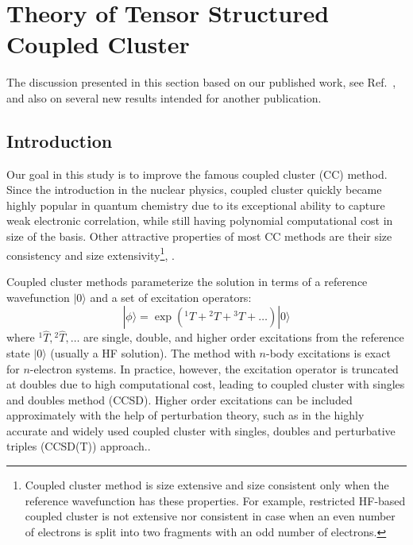 \chapter{Theory of Tensor Structured Coupled Cluster
\label{ch:tcc}} 
The discussion presented in this section based on our published work, see 
Ref.~\cite{schutski2017tensor}, and also on several new results intended for 
another publication.

\section{Introduction}
\label{sec:Introduction} 
Our goal in this study is to improve the famous coupled cluster (CC)
method. Since the introduction in the nuclear physics,\cite{coester1958bound, 
coester1960short} coupled cluster quickly became highly popular in quantum 
chemistry due to its exceptional ability to capture weak electronic correlation, 
while still having polynomial computational cost in size of the basis. Other 
attractive properties of most CC methods are their size consistency and size 
extensivity\footnote{Coupled cluster method is size 
extensive and size consistent only when the reference 
wavefunction has these properties. For example, 
restricted HF-based coupled cluster is not extensive nor consistent in case 
when an even number of electrons is split into two fragments with an odd number 
of electrons.}, \cite{pople1978electron, 
bartlett1978many, crawford2000introduction, bartlett2007coupled}. 

Coupled cluster methods parameterize the solution in terms of a reference 
wavefunction $| 0 \rangle$ and a set of excitation operators:
\begin{equation}
 | \phi \rangle  = \exp({}^1\hat{T} + {}^2\hat{T} + {}^3\hat{T} + \ldots) | 0 
\rangle
\end{equation}
where ${}^1\hat{T}, {}^2\hat{T}, \ldots$ are single, double, and 
higher order excitations from the reference state $| 0 \rangle$ (usually a HF 
solution). The method with $n$-body excitations is exact for $n$-electron 
systems. In practice, however, the excitation operator is truncated at doubles 
due to high computational cost, leading to coupled cluster with singles and 
doubles method (CCSD).\cite{purvis1982full} Higher order excitations can be 
included approximately with the help of perturbation theory, such as in the 
highly accurate and widely used coupled cluster with singles, doubles and 
perturbative triples (CCSD(T)) approach.\cite{bartlett1990non}.


